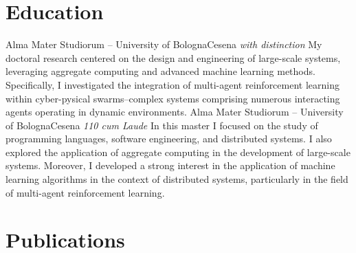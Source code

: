 \documentclass[10pt,a4paper,roman]{moderncv}        %
\begin{document}
\section{Education}

%
 {Alma Mater Studiorum -- University of Bologna}{Cesena}
 {\textit{with distinction}}{
My doctoral research centered on the design and engineering of large-scale systems, leveraging aggregate computing and advanced machine learning methods. Specifically, I investigated the integration of multi-agent reinforcement learning within cyber-pysical swarms--complex systems comprising numerous interacting agents operating in dynamic environments.
 }
%
 {Alma Mater Studiorum -- University of Bologna}{Cesena}
 {\textit{110 cum Laude}}{
  In this master I focused on the study of programming languages, software engineering, and distributed systems. I also explored the application of aggregate computing in the development of large-scale systems.
  Moreover, I developed a strong interest in the application of machine learning algorithms in the context of distributed systems, particularly in the field of multi-agent reinforcement learning.
 }


\section{Publications}
\end{document}
